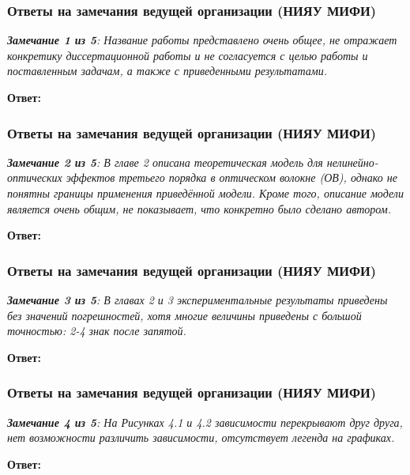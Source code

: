 \begin{frame}
	\frametitle{Ответы на замечания ведущей организации (НИЯУ МИФИ)}
	\small{\textit{\textbf{Замечание 1 из 5}: Название работы представлено очень общее, не отражает конкретику диссертационной работы и не согласуется с целью работы и поставленным задачам, а также с приведенными результатами. }}
	
	\hfill
	
	\textbf{Ответ:} 
	
\end{frame}

\begin{frame}
	\frametitle{Ответы на замечания ведущей организации (НИЯУ МИФИ)}
	\small{\textit{\textbf{Замечание 2 из 5}: В главе 2 описана теоретическая модель для нелинейно-оптических эффектов третьего порядка в оптическом волокне (ОВ), однако не понятны границы применения приведённой модели. Кроме того, описание модели является очень общим, не показывает, что конкретно было сделано автором.}}
	
	\hfill
	
	\textbf{Ответ:} 
	
\end{frame}


\begin{frame}
	\frametitle{Ответы на замечания ведущей организации (НИЯУ МИФИ)}
	\small{\textit{\textbf{Замечание 3 из 5}: В главах 2 и 3 экспериментальные результаты приведены без значений погрешностей, хотя многие величины приведены с большой точностью: 2-4 знак после запятой.}}
	
	\hfill
	
	\textbf{Ответ:} 
	
\end{frame}

\begin{frame}
	\frametitle{Ответы на замечания ведущей организации (НИЯУ МИФИ)}
	\small{\textit{\textbf{Замечание 4 из 5}: На Рисунках 4.1 и 4.2 зависимости перекрывают друг друга, нет возможности различить зависимости, отсутствует легенда на графиках.}}
	
	\hfill
	
	\textbf{Ответ:} 
	
\end{frame}

